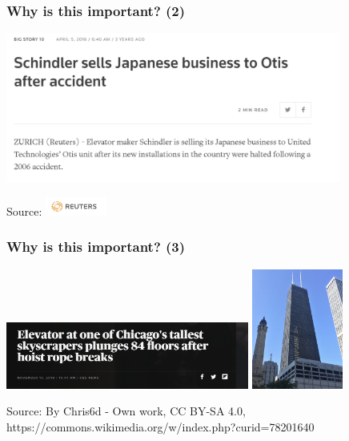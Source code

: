 \begin{frame}
\frametitle{Why is this important? (2)}
\includegraphics[width=11cm]{imagesfieldservice/schindlerjapan}

Source: \includegraphics[width=2cm]{imagesfieldservice/reuters}

\end{frame}

\begin{frame}
\frametitle{Why is this important? (3)}
\includegraphics[width=8cm]{imagesfieldservice/hancock}
\includegraphics[width=3cm]{imagesfieldservice/John_Hancock_Center_2019}

{\tiny Source: By Chris6d - Own work, CC BY-SA 4.0, https://commons.wikimedia.org/w/index.php?curid=78201640}
\end{frame}



% 

